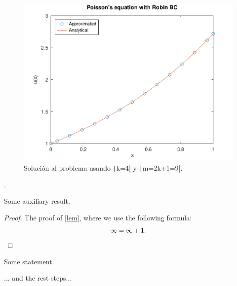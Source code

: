 \begin{problem}
\begin{figure}[ht!]
    \centering
    \includegraphics[width=.6\paperwidth]{../examples/octave/elliptic1D.pdf}
    \caption{Solución al problema usando \texttt|k=4| y \texttt|m=2k+1=9|.}
\end{figure}

\noQED %
\end{problem}

\begin{problem}
.
\end{problem}

\begin{solution}
    \begin{lemma}\label{lem}
        Some auxiliary result.
    \end{lemma}
    \begin{proof}
        The proof of \cref{lem}, where we use the following formula:
        \[
            \infty = \infty + 1.
            \qedhere %
        \]
    \end{proof}
    \begin{fact}
        \proofless %
        Some statement.
    \end{fact}
    ... and the rest steps...

\end{solution}